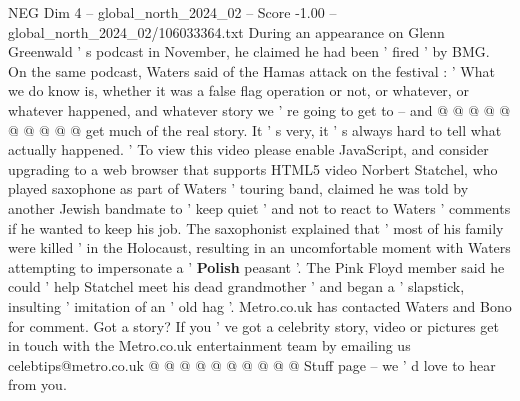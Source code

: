 \begin{textsample}{NEG Dim 4 – global\_north\_2024\_02 – Score -1.00 – global\_north\_2024\_02/106033364.txt}
During an appearance on Glenn Greenwald ' s podcast in November, he claimed he had been ' fired ' by BMG.
On the same podcast, Waters said of the Hamas attack on the festival : ' What we do know is, whether it was a false flag operation or not, or whatever, or whatever happened, and whatever story we ' re going to get to -- and @ @ @ @ @ @ @ @ @ @ get much of the real story.
It ' s very, it ' s always hard to tell what actually happened. ' To view this video please enable JavaScript, and consider upgrading to a web browser that supports HTML5 video Norbert Statchel, who played saxophone as part of Waters ' touring band, claimed he was told by another Jewish bandmate to ' keep quiet ' and not to react to Waters ' comments if he wanted to keep his job.
The saxophonist explained that ' most of his family were killed ' in the Holocaust, resulting in an uncomfortable moment with Waters attempting to impersonate a ' \textbf{Polish} peasant '.
The Pink Floyd member said he could ' help Statchel meet his dead grandmother ' and began a ' slapstick, insulting ' imitation of an ' old hag '.
Metro.co.uk has contacted Waters and Bono for comment.
Got a story?
If you ' ve got a celebrity story, video or pictures get in touch with the Metro.co.uk entertainment team by emailing us celebtips@metro.co.uk @ @ @ @ @ @ @ @ @ @ Stuff page -- we ' d love to hear from you.

\end{textsample}
